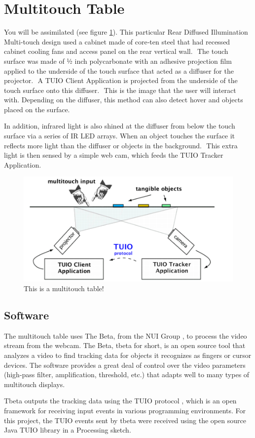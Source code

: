 \section{Multitouch Table}
You will be assimilated (see figure \ref{fig:mtdiagram}). 
This particular Rear Diffused Illumination Multi‐touch design used a cabinet made of core‐ten steel that had recessed cabinet cooling fans and access panel on the rear vertical wall.  The touch surface was made of 1⁄2 inch polycarbonate with an adhesive projection film applied to the underside of the touch surface that acted as a diffuser for the projector.  A TUIO Client Application is projected from the underside of the touch surface onto this diffuser.  This is the image that the user will interact with. Depending on the diffuser, this method can also detect hover and objects placed on the surface.  

In addition, infrared light is also shined at the diffuser from below the touch surface via a series of IR LED arrays. When an object touches the surface it reflects more light than the diffuser or objects in the background.  This extra light is then sensed by a simple web cam, which feeds the TUIO Tracker Application.  

\begin{figure}[htp]\centering
  \includegraphics[width=.8\textwidth]{images/mt-diagram.png}
  \caption{This is a multitouch table!}\label{fig:mtdiagram}
\end{figure}
\subsection{Software}
The multitouch table uses The Beta, from the NUI Group \cite{NUI}, to process the video stream from the webcam. The Beta, tbeta for short, is an open source tool that analyzes a video to find tracking data for objects it recognizes as fingers or cursor devices. The software provides a great deal of control over the video parameters (high-pass filter, amplification, threshold, etc.) that adapts well to many types of multitouch displays.

Tbeta outputs the tracking data using the TUIO protocol \cite{TUIO}, which is an open framework for receiving input events in various programming environments. For this project, the TUIO events sent by tbeta were received using the open source Java TUIO library in a Processing sketch. 

